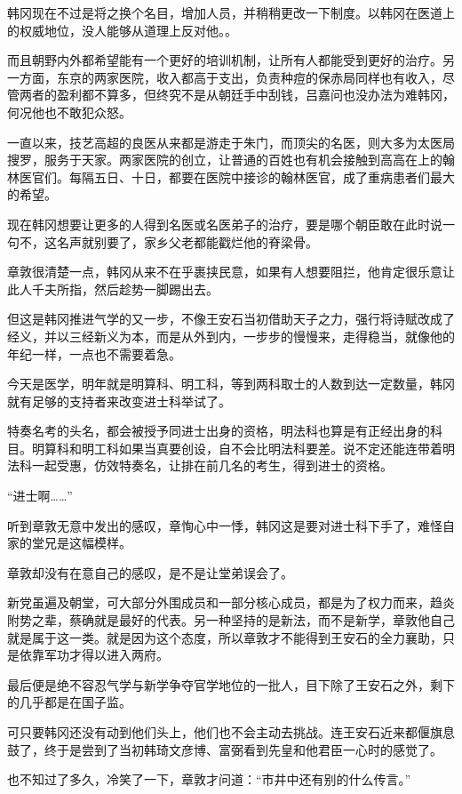 韩冈现在不过是将之换个名目，增加人员，并稍稍更改一下制度。以韩冈在医道上的权威地位，没人能够从道理上反对他。。

而且朝野内外都希望能有一个更好的培训机制，让所有人都能受到更好的治疗。另一方面，东京的两家医院，收入都高于支出，负责种痘的保赤局同样也有收入，尽管两者的盈利都不算多，但终究不是从朝廷手中刮钱，吕嘉问也没办法为难韩冈，何况他也不敢犯众怒。

一直以来，技艺高超的良医从来都是游走于朱门，而顶尖的名医，则大多为太医局搜罗，服务于天家。两家医院的创立，让普通的百姓也有机会接触到高高在上的翰林医官们。每隔五日、十日，都要在医院中接诊的翰林医官，成了重病患者们最大的希望。

现在韩冈想要让更多的人得到名医或名医弟子的治疗，要是哪个朝臣敢在此时说一句不，这名声就别要了，家乡父老都能戳烂他的脊梁骨。

章敦很清楚一点，韩冈从来不在乎裹挟民意，如果有人想要阻拦，他肯定很乐意让此人千夫所指，然后趁势一脚踢出去。

但这是韩冈推进气学的又一步，不像王安石当初借助天子之力，强行将诗赋改成了经义，并以三经新义为本，而是从外到内，一步步的慢慢来，走得稳当，就像他的年纪一样，一点也不需要着急。

今天是医学，明年就是明算科、明工科，等到两科取士的人数到达一定数量，韩冈就有足够的支持者来改变进士科举试了。

特奏名考的头名，都会被授予同进士出身的资格，明法科也算是有正经出身的科目。明算科和明工科如果当真要创设，自不会比明法科要差。说不定还能连带着明法科一起受惠，仿效特奏名，让排在前几名的考生，得到进士的资格。

“进士啊……”

听到章敦无意中发出的感叹，章恂心中一悸，韩冈这是要对进士科下手了，难怪自家的堂兄是这幅模样。

章敦却没有在意自己的感叹，是不是让堂弟误会了。

新党虽遍及朝堂，可大部分外围成员和一部分核心成员，都是为了权力而来，趋炎附势之辈，蔡确就是最好的代表。另一种坚持的是新法，而不是新学，章敦他自己就是属于这一类。就是因为这个态度，所以章敦才不能得到王安石的全力襄助，只是依靠军功才得以进入两府。

最后便是绝不容忍气学与新学争夺官学地位的一批人，目下除了王安石之外，剩下的几乎都是在国子监。

可只要韩冈还没有动到他们头上，他们也不会主动去挑战。连王安石近来都偃旗息鼓了，终于是尝到了当初韩琦文彦博、富弼看到先皇和他君臣一心时的感觉了。

也不知过了多久，冷笑了一下，章敦才问道：“市井中还有别的什么传言。”

